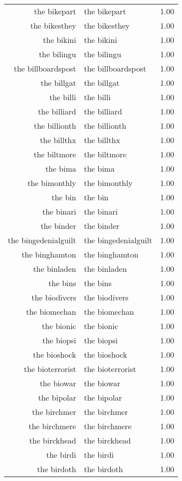 \begin{table}[ht]
\begin{tabular}{rlr}
  the bikepart & the bikepart & 1.00 \\ 
  the bikesthey & the bikesthey & 1.00 \\ 
  the bikini & the bikini & 1.00 \\ 
  the bilingu & the bilingu & 1.00 \\ 
  the billboardspost & the billboardspost & 1.00 \\ 
  the billgat & the billgat & 1.00 \\ 
  the billi & the billi & 1.00 \\ 
  the billiard & the billiard & 1.00 \\ 
  the billionth & the billionth & 1.00 \\ 
  the billthx & the billthx & 1.00 \\ 
  the biltmore & the biltmore & 1.00 \\ 
  the bima & the bima & 1.00 \\ 
  the bimonthly & the bimonthly & 1.00 \\ 
  the bin & the bin & 1.00 \\ 
  the binari & the binari & 1.00 \\ 
  the binder & the binder & 1.00 \\ 
  the bingedenialguilt & the bingedenialguilt & 1.00 \\ 
  the binghamton & the binghamton & 1.00 \\ 
  the binladen & the binladen & 1.00 \\ 
  the bins & the bins & 1.00 \\ 
  the biodivers & the biodivers & 1.00 \\ 
  the biomechan & the biomechan & 1.00 \\ 
  the bionic & the bionic & 1.00 \\ 
  the biopsi & the biopsi & 1.00 \\ 
  the bioshock & the bioshock & 1.00 \\ 
  the bioterrorist & the bioterrorist & 1.00 \\ 
  the biowar & the biowar & 1.00 \\ 
  the bipolar & the bipolar & 1.00 \\ 
  the birchmer & the birchmer & 1.00 \\ 
  the birchmere & the birchmere & 1.00 \\ 
  the birckhead & the birckhead & 1.00 \\ 
  the birdi & the birdi & 1.00 \\ 
  the birdoth & the birdoth & 1.00 \\ 

\end{tabular}
\end{table}
